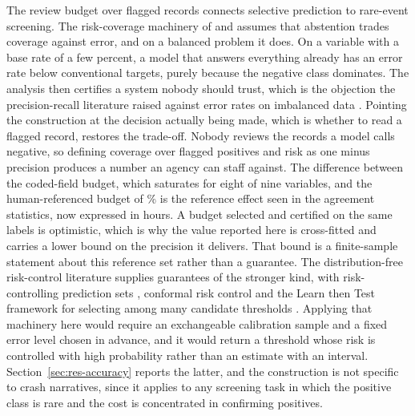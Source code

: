 The review budget over flagged records connects selective prediction to rare-event screening.
The risk-coverage machinery of \citet{elyaniv2010foundations} and \citet{geifman2017selective}
assumes that abstention trades coverage against error, and on a balanced problem it does. On
a variable with a base rate of a few percent, a model that answers everything already has an
error rate below conventional targets, purely because the negative class dominates. The
analysis then certifies a system nobody should trust, which is the objection the
precision-recall literature raised against error rates on imbalanced data
\citep{davis2006prroc,saito2015prplot}. Pointing the construction at the decision actually
being made, which is whether to read a flagged record, restores the trade-off. Nobody reviews
the records a model calls negative, so defining coverage over flagged positives and risk as
one minus precision produces a number an agency can staff against. The difference between the
coded-field budget, which saturates for eight of nine variables, and the human-referenced
budget of \GoldBudgetNinety\% is the reference effect seen in the agreement statistics, now
expressed in hours. A budget selected and certified on the same labels is optimistic, which is
why the value reported here is cross-fitted and carries a lower bound on the precision it
delivers. That bound is a finite-sample statement about this reference set rather than a
guarantee. The distribution-free risk-control literature supplies guarantees of the stronger
kind, with risk-controlling prediction sets \citep{bates2021distribution}, conformal risk
control \citep{angelopoulos2024conformal} and the Learn then Test framework for selecting
among many candidate thresholds \citep{angelopoulos2025learn}. Applying that machinery here
would require an exchangeable calibration sample and a fixed error level chosen in advance,
and it would return a threshold whose risk is controlled with high probability rather than an
estimate with an interval. Section~\ref{sec:res-accuracy} reports the latter, and the
construction is not specific to crash narratives, since it applies to any screening task in
which the positive class is rare and the cost is concentrated in confirming positives.

